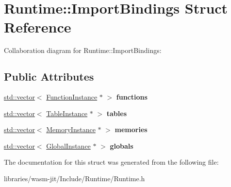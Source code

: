 \hypertarget{struct_runtime_1_1_import_bindings}{}\section{Runtime\+:\+:Import\+Bindings Struct Reference}
\label{struct_runtime_1_1_import_bindings}


Collaboration diagram for Runtime\+:\+:Import\+Bindings\+:
\subsection*{Public Attributes}
\begin{DoxyCompactItemize}
\item 
\mbox{\label{struct_runtime_1_1_import_bindings_a05c44127b87dedf1fa4499d59db57937}} 
\mbox{\hyperlink{classstd_1_1vector}{std\+::vector}}$<$ \mbox{\hyperlink{struct_runtime_1_1_function_instance}{Function\+Instance}} $\ast$ $>$ {\bfseries functions}
\item 
\mbox{\label{struct_runtime_1_1_import_bindings_a59e7cea57108b9fd7a3ad56c6e11be82}} 
\mbox{\hyperlink{classstd_1_1vector}{std\+::vector}}$<$ \mbox{\hyperlink{struct_runtime_1_1_table_instance}{Table\+Instance}} $\ast$ $>$ {\bfseries tables}
\item 
\mbox{\label{struct_runtime_1_1_import_bindings_a0832d03e00f20cca7ce26ed2bd9a1ddc}} 
\mbox{\hyperlink{classstd_1_1vector}{std\+::vector}}$<$ \mbox{\hyperlink{struct_runtime_1_1_memory_instance}{Memory\+Instance}} $\ast$ $>$ {\bfseries memories}
\item 
\mbox{\label{struct_runtime_1_1_import_bindings_a09bd92233b7921d5723380002cd35d75}} 
\mbox{\hyperlink{classstd_1_1vector}{std\+::vector}}$<$ \mbox{\hyperlink{struct_runtime_1_1_global_instance}{Global\+Instance}} $\ast$ $>$ {\bfseries globals}
\end{DoxyCompactItemize}


The documentation for this struct was generated from the following file\+:\begin{DoxyCompactItemize}
\item 
libraries/wasm-\/jit/\+Include/\+Runtime/Runtime.\+h\end{DoxyCompactItemize}
